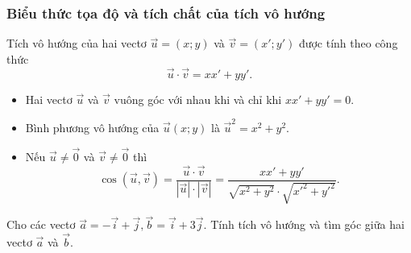 \subsubsection{Biểu thức tọa độ và tích chất của tích vô hướng}
	Tích vô hướng của hai vectơ $\vec{u}=\left(x;y\right)$ và $\vec{v}=\left(x';y'\right)$ được tính theo công thức
	$$\vec{u} \cdot \vec{v} = xx'+yy'.$$
\begin{nx}
	\textbf{}
\begin{itemize}
	\item Hai vectơ $\vec{u}$ và $\vec{v}$ vuông góc với nhau khi và chỉ khi $xx' + yy'=0$.
	\item Bình phương vô hướng của $\vec{u}(x;y)$ là $\vec{u}^2=x^2+y^2$.
	\item Nếu $\vec{u} \ne \vec{0}$ và $\vec{v}\ne \vec{0}$ thì $$\cos \left(\vec{u},\vec{v}\right)=\dfrac{\vec{u}\cdot \vec{v}}{\left| \vec{u}\right|\cdot \left| \vec{v}\right|}=\dfrac{xx'+yy'}{\sqrt{x^2+y^2}\cdot \sqrt{x'^2+y'^2}}.$$
\end{itemize}
\end{nx}

\begin{vd}%
	Cho các vectơ $\overrightarrow{a}=-\overrightarrow{i}+\overrightarrow{j}, \overrightarrow{b}=\overrightarrow{i}+3\overrightarrow{j}$. Tính tích vô hướng và tìm góc giữa hai vectơ $\overrightarrow{a}$ và $\overrightarrow{b}$.
\end{vd}


